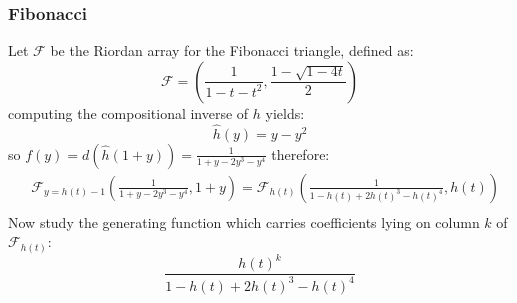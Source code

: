 \subsubsection{Fibonacci}
Let $\mathcal{F}$ be the Riordan array for the Fibonacci triangle,
defined as:
\begin{displaymath} 
    \mathcal{F} = \left(\frac{1}{1-t-t^2}, \frac{1-\sqrt{1-4t}}{2}  \right)
\end{displaymath} 
computing the compositional inverse of $h$ yields:
\begin{displaymath} 
    \hat{h}(y) = y - y^2
\end{displaymath} 
so $f(y)=d(\hat{h}(1+y))=\frac{1}{1+y-2y^3-y^4}$ therefore:
\begin{displaymath} 
    \begin{split} 
        & \mathcal{F}_{y=h(t)-1}\left( \frac{1}{1+y-2y^3-y^4}, 1+y \right) = \mathcal{F}_{h(t)}\left( \frac{1}{1-h(t)+2h(t)^3-h(t)^4}, h(t) \right)\\
    \end{split} 
\end{displaymath} 
Now study the generating function which carries coefficients lying on column $k$
of $\mathcal{F}_{h(t)}$:
\begin{displaymath} 
    \frac{h(t)^k}{1-h(t)+2h(t)^3-h(t)^4}
\end{displaymath} 

